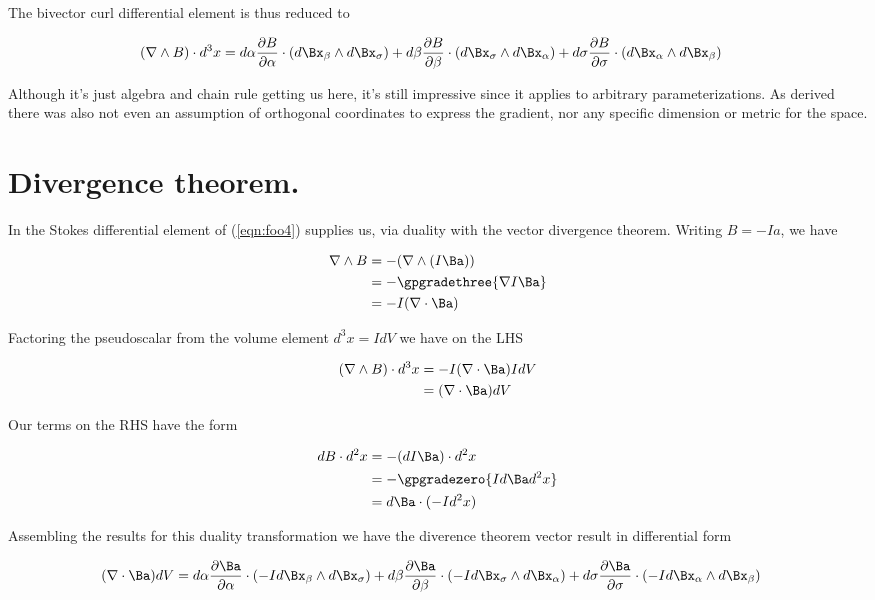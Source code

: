 The bivector curl differential element is thus reduced to

\begin{align}\label{eqn:foo4}
(\grad \wedge B) \cdot d^3 x
&=
 d\alpha \PD{\alpha}{B} \cdot (d\Bx_\beta \wedge d\Bx_\sigma) 
+d\beta \PD{\beta}{B} \cdot (d\Bx_\sigma \wedge d\Bx_\alpha) 
+d\sigma \PD{\sigma}{B} \cdot (d\Bx_\alpha \wedge d\Bx_\beta) 
\end{align}

Although it's just algebra and chain rule getting us here, it's still impressive since it applies to arbitrary parameterizations.  As derived there was also not even an assumption of orthogonal coordinates to express the gradient, nor any specific dimension or metric for the space.

\section{Divergence theorem.}

In  the Stokes differential element of (\ref{eqn:foo4}) supplies us, via duality with the vector divergence theorem.  Writing $B = -I a$, we have

\begin{align*}
\grad \wedge B 
&= -(\grad \wedge (I\Ba)) \\
&= - \gpgradethree{ \grad I\Ba } \\
&= - I (\grad \cdot \Ba )
\end{align*}

Factoring the pseudoscalar from the volume element $d^3 x = I dV$ we have on the LHS 

\begin{align*}
(\grad \wedge B) \cdot d^3 x
&= - I (\grad \cdot \Ba ) I dV \\
&= (\grad \cdot \Ba ) dV \\
\end{align*}

Our terms on the RHS have the form

\begin{align*}
d B \cdot d^2 x
&=
-(d I \Ba) \cdot d^2 x \\
&=
- \gpgradezero{ I d \Ba d^2 x } \\
&=
d \Ba \cdot (-I d^2 x) 
\end{align*}

Assembling the results for this duality transformation we have the diverence theorem vector result in differential form

\begin{align}\label{eqn:foo5}
(\grad \cdot \Ba ) dV &=
 d\alpha \PD{\alpha}{\Ba} \cdot (-I d\Bx_\beta \wedge d\Bx_\sigma) 
+d\beta \PD{\beta}{\Ba} \cdot (-I d\Bx_\sigma \wedge d\Bx_\alpha) 
+d\sigma \PD{\sigma}{\Ba} \cdot (-I d\Bx_\alpha \wedge d\Bx_\beta) 
\end{align}

